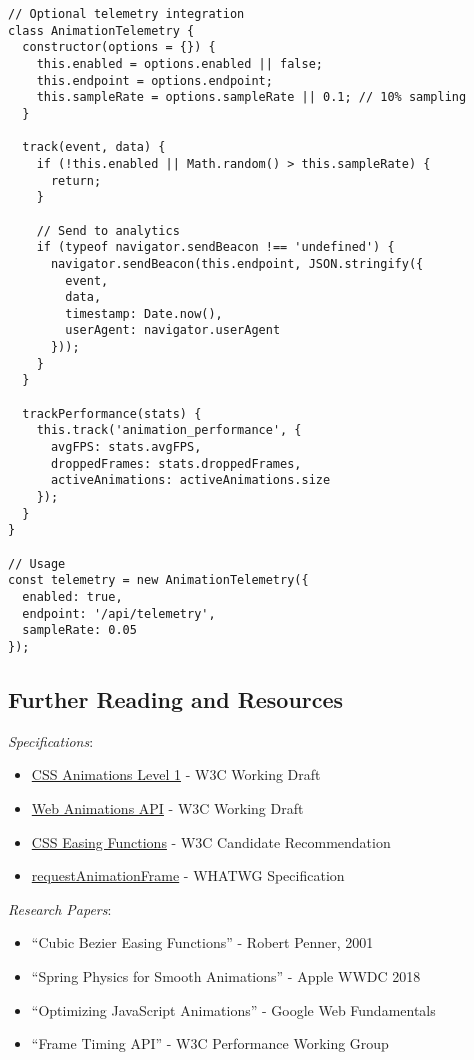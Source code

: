 \documentclass[11pt]{article}
\begin{document}
\begin{verbatim}
// Optional telemetry integration
class AnimationTelemetry {
  constructor(options = {}) {
    this.enabled = options.enabled || false;
    this.endpoint = options.endpoint;
    this.sampleRate = options.sampleRate || 0.1; // 10% sampling
  }
  
  track(event, data) {
    if (!this.enabled || Math.random() > this.sampleRate) {
      return;
    }
    
    // Send to analytics
    if (typeof navigator.sendBeacon !== 'undefined') {
      navigator.sendBeacon(this.endpoint, JSON.stringify({
        event,
        data,
        timestamp: Date.now(),
        userAgent: navigator.userAgent
      }));
    }
  }
  
  trackPerformance(stats) {
    this.track('animation_performance', {
      avgFPS: stats.avgFPS,
      droppedFrames: stats.droppedFrames,
      activeAnimations: activeAnimations.size
    });
  }
}

// Usage
const telemetry = new AnimationTelemetry({
  enabled: true,
  endpoint: '/api/telemetry',
  sampleRate: 0.05
});
\end{verbatim}
\subsection{Further Reading and Resources}
\label{sec:orge641d2c}

\emph{Specifications}:

\begin{itemize}
\item \href{https://www.w3.org/TR/css-animations-1/}{CSS Animations Level 1} - W3C Working Draft
\item \href{https://www.w3.org/TR/web-animations-1/}{Web Animations API} - W3C Working Draft
\item \href{https://www.w3.org/TR/css-easing-1/}{CSS Easing Functions} - W3C Candidate Recommendation
\item \href{https://html.spec.whatwg.org/multipage/imagebitmap-and-animations.html\#animation-frames}{requestAnimationFrame} - WHATWG Specification
\end{itemize}

\emph{Research Papers}:

\begin{itemize}
\item ``Cubic Bezier Easing Functions'' - Robert Penner, 2001
\item ``Spring Physics for Smooth Animations'' - Apple WWDC 2018
\item ``Optimizing JavaScript Animations'' - Google Web Fundamentals
\item ``Frame Timing API'' - W3C Performance Working Group
\end{itemize}
\end{document}
